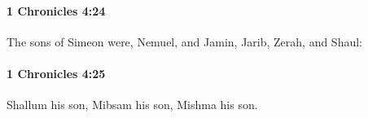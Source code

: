 		\paragraph{1 Chronicles 4:24} %
			\label{1CHRONICLES-4-24}

			The sons of Simeon were, Nemuel, and Jamin, Jarib, Zerah, and Shaul:


		\paragraph{1 Chronicles 4:25} %
			\label{1CHRONICLES-4-25}

			Shallum his son, Mibsam his son, Mishma his son.


